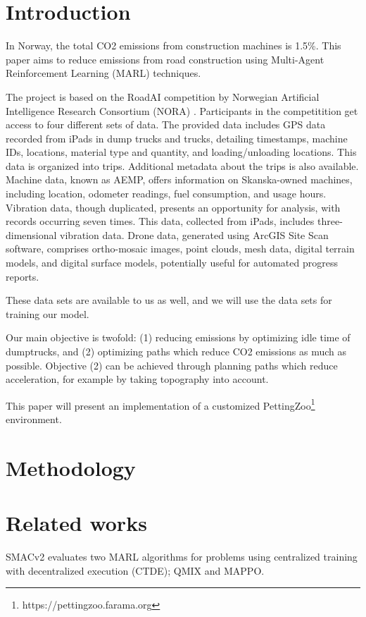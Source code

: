 \documentclass[conference]{IEEEtran}
\begin{document}
\section{Introduction}
In Norway, the total CO2 emissions from construction machines is 1.5\%. \cite{noraRoadAIReducing}
This paper aims to reduce emissions from road construction using Multi-Agent Reinforcement Learning
(MARL) techniques.

The project is based on the RoadAI competition by Norwegian Artificial Intelligence Research
Consortium (NORA) \cite{noraRoadAIReducing}. Participants in the competitition get access to four
different sets of data. The provided data includes GPS data recorded from iPads in dump trucks and
trucks, detailing timestamps, machine IDs, locations, material type and quantity, and loading/unloading
locations. This data is organized into trips. Additional metadata about the trips is also available.
Machine data, known as AEMP, offers information on Skanska-owned machines, including location,
odometer readings, fuel consumption, and usage hours. Vibration data, though duplicated,
presents an opportunity for analysis, with records occurring seven times. This data, collected from
iPads, includes three-dimensional vibration data. Drone data, generated using ArcGIS Site Scan software,
comprises ortho-mosaic images, point clouds, mesh data, digital terrain models, and digital surface models,
potentially useful for automated progress reports.

These data sets are available to us as well, and we will use the data sets for training our model.

Our main objective is twofold: (1) reducing emissions by optimizing idle time of dumptrucks, and (2)
optimizing paths which reduce CO2 emissions as much as possible. Objective (2) can be achieved through
planning paths which reduce acceleration, for example by taking topography into account.

This paper will present an implementation of a customized PettingZoo\footnote{https://pettingzoo.farama.org}
environment.


\section{Methodology}


\section{Related works}
SMACv2 \cite{ellis2022smacv2} evaluates two MARL algorithms for problems using centralized training with
decentralized execution (CTDE); QMIX and MAPPO.
\end{document}
